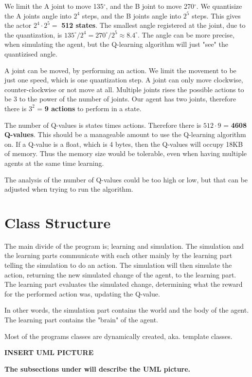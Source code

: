 \documentclass{article}
\begin{document}
We limit the A joint to move 135$^\circ$, and the B joint to move
270$^\circ$. We quantisize the A joints angle into $2^4$ steps, and
the B joints angle into $2^5$ steps. This gives the actor
$2^4 \cdot 2^5 =$ \textbf{512 states}. The smallest angle registered at
the joint, due to the quantization, is
$135^\circ / 2^4 = 270^\circ / 2^5 \approx 8.4^\circ$.
The angle can be more precise, when simulating the agent, but the
Q-learning algorithm will just "see" the quantizised angle.

A joint can be moved, by performing an action. We limit the movement to be
just one speed, which is one quantization step. A joint can only move
clockwise, counter-clockwise or not move at all. Multiple joints rises the
possible actions to be 3 to the power of the number of joints. Our
agent has two joints, therefore there is $3^2$ = \textbf{9 actions} to
perform in a state.

The number of Q-values is states times actions. Therefore there is
$512 \cdot 9$ = \textbf{4608 Q-values}. This should be a manageable
amount to use the Q-learning algorithm on. If a Q-value is a float,
which is 4 bytes, then the Q-values will occupy 18KB of memory.
Thus the memory size would be tolerable, even when having multiple agents
at the same time learning.

The analysis of the number of Q-values could be too high or low, but that
can be adjusted when trying to run the algorithm.



\section{Class Structure}
The main divide of the program is; learning and simulation. The
simulation and the learning parts communicate with each other mainly by the
learning part telling the simulation to do an action. The simulation will then
simulate the action, returning the new simulated change of the agent, to the
learning part. The learning part evaluates the simulated change, determining
what the reward for the performed action was, updating the Q-value.

In other words, the simulation part contains the world and the body of the agent.
The learning part contains the "brain" of the agent.

Most of the programs classes are dynamically created, aka. template classes.

\textbf{INSERT UML PICTURE}

\textbf{The subsections under will describe the UML picture.}
\end{document}
